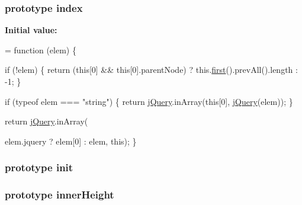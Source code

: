 \subsubsection[{\texorpdfstring{index}{index}}]{ {\bf prototype} index}\hypertarget{jquery-2_82_81-vsdoc_8js_a75bb12d1f23302a9eea93a6d89d0193e}{}\label{jquery-2_82_81-vsdoc_8js_a75bb12d1f23302a9eea93a6d89d0193e}
{\bfseries Initial value\+:}
\begin{DoxyCode}
= \textcolor{keyword}{function} (elem) \{
        


        
        \textcolor{keywordflow}{if} (!elem) \{
            \textcolor{keywordflow}{return} (\textcolor{keyword}{this}[0] && \textcolor{keyword}{this}[0].parentNode) ? this.\hyperlink{jquery-2_82_81-vsdoc_8js_a436adcac6bdff190fbce85670078e885}{first}().prevAll().length : -1;
        \}

        
        \textcolor{keywordflow}{if} (typeof elem === \textcolor{stringliteral}{"string"}) \{
            \textcolor{keywordflow}{return} \hyperlink{jquery-2_82_81-vsdoc_8js_add5237586d970a38a81f990e8eb28c6c}{jQuery}.inArray(\textcolor{keyword}{this}[0], \hyperlink{jquery-2_82_81-vsdoc_8js_add5237586d970a38a81f990e8eb28c6c}{jQuery}(elem));
        \}

        
        \textcolor{keywordflow}{return} \hyperlink{jquery-2_82_81-vsdoc_8js_add5237586d970a38a81f990e8eb28c6c}{jQuery}.inArray(
            
            elem.jquery ? elem[0] : elem, \textcolor{keyword}{this});
    \}
\end{DoxyCode}
\subsubsection[{\texorpdfstring{init}{init}}]{ {\bf prototype} init}\hypertarget{jquery-2_82_81-vsdoc_8js_a4d7eae8a73366d18982efeb109237a74}{}\label{jquery-2_82_81-vsdoc_8js_a4d7eae8a73366d18982efeb109237a74}
\subsubsection[{\texorpdfstring{inner\+Height}{innerHeight}}]{ {\bf prototype} inner\+Height}\hypertarget{jquery-2_82_81-vsdoc_8js_a74b254137855e091d242946fbbe2fbe8}{}\label{jquery-2_82_81-vsdoc_8js_a74b254137855e091d242946fbbe2fbe8}
